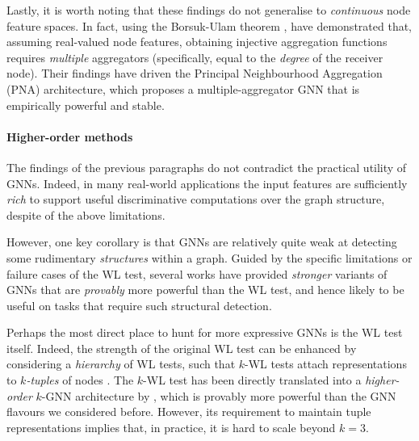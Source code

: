 Lastly, it is worth noting that these findings do not generalise to \emph{continuous} node feature spaces. In fact, using the Borsuk-Ulam theorem \citep{borsuk1933drei}, \citet{corso2020principal} have demonstrated that, assuming real-valued node features, obtaining injective aggregation functions requires \emph{multiple} aggregators (specifically, equal to the \emph{degree} of the receiver node). Their findings have driven the Principal Neighbourhood Aggregation (PNA) architecture, which proposes a multiple-aggregator GNN that is empirically powerful and stable.

\paragraph{Higher-order methods} %

The findings of the previous paragraphs do not contradict the practical utility of GNNs. Indeed, in many real-world applications the input features are sufficiently \emph{rich} to support useful discriminative computations over the graph structure, despite of the above limitations. 

However, one key corollary is that GNNs are relatively quite weak at detecting some rudimentary \emph{structures} within a graph. Guided by the specific limitations or failure cases of the WL test, several works have provided \emph{stronger} variants of GNNs that are \emph{provably} more powerful than the WL test, and hence likely to be useful on tasks that require such structural detection.

Perhaps the most direct place to hunt for more expressive GNNs is the WL test itself. Indeed, the strength of the original WL test can be enhanced by considering a \emph{hierarchy} of WL tests, such that $k$-WL tests attach representations to $k$\emph{-tuples} of nodes \citep{morris2017glocalized}. The $k$-WL test has been directly translated into a \emph{higher-order} $k$-GNN architecture by \citet{morris2019weisfeiler}, which is provably more powerful than the GNN flavours we considered before. However, its requirement to maintain tuple representations implies that, in practice, it is hard to scale beyond $k=3$.

